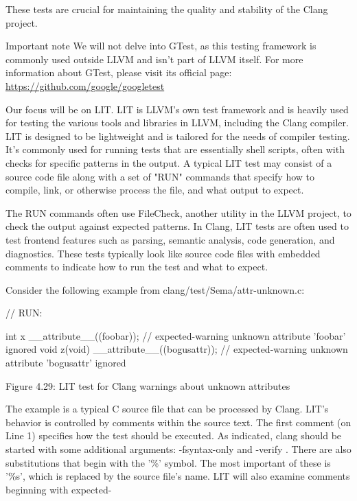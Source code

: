These tests are crucial for maintaining the quality and stability of the Clang project.

\begin{myNotic}{Important note}
We will not delve into GTest, as this testing framework is commonly used outside LLVM and isn't part of LLVM itself. For more information about GTest, please visit its official page: \url{https://github.com/google/googletest}
\end{myNotic}

Our focus will be on LIT. LIT is LLVM's own test framework and is heavily used for testing the various tools and libraries in LLVM, including the Clang compiler. LIT is designed to be lightweight and is tailored for the needs of compiler testing. It's commonly used for running tests that are essentially shell scripts, often with checks for specific patterns in the output. A typical LIT test may consist of a source code file along with a set of "RUN" commands that specify how to compile, link, or otherwise process the file, and what output to expect.

The RUN commands often use FileCheck, another utility in the LLVM project, to check the output against expected patterns. In Clang, LIT tests are often used to test frontend features such as parsing, semantic analysis, code generation, and diagnostics. These tests typically look like source code files with embedded comments to indicate how to run the test and what to expect.

Consider the following example from clang/test/Sema/attr-unknown.c:

\begin{cpp}
// RUN: %

int x __attribute__((foobar)); // expected-warning {{unknown attribute 'foobar' ignored}}
void z(void) __attribute__((bogusattr)); // expected-warning {{unknown attribute 'bogusattr' ignored}}
\end{cpp}

\begin{center}
Figure 4.29: LIT test for Clang warnings about unknown attributes
\end{center}

The example is a typical C source file that can be processed by Clang. LIT's behavior is controlled by comments within the source text. The first comment (on Line 1) specifies how the test should be executed. As indicated, clang should be started with some additional arguments: -fsyntax-only and -verify . There are also substitutions that begin with the '\%' symbol. The most important of these is '\%s', which is replaced by the source file's name. LIT will also examine comments beginning with expected-

